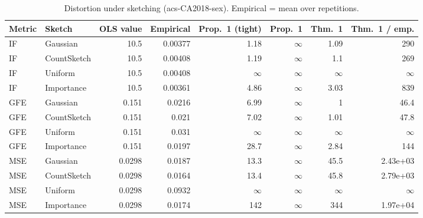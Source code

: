 \begin{table}[t]
\centering
\small
\begin{tabular}{llrrrrrr}
\toprule
Metric & Sketch & OLS value & Empirical & Prop.~1 (tight) & Prop.~1 & Thm.~1 & Thm.~1 / emp. \\
\midrule
IF & Gaussian & 10.5 & 0.00377 & 1.18 & $\infty$ & 1.09 & 290 \\
IF & CountSketch & 10.5 & 0.00408 & 1.19 & $\infty$ & 1.1 & 269 \\
IF & Uniform & 10.5 & 0.00408 & $\infty$ & $\infty$ & $\infty$ & $\infty$ \\
IF & Importance & 10.5 & 0.00361 & 4.86 & $\infty$ & 3.03 & 839 \\
\midrule
GFE & Gaussian & 0.151 & 0.0216 & 6.99 & $\infty$ & 1 & 46.4 \\
GFE & CountSketch & 0.151 & 0.021 & 7.02 & $\infty$ & 1.01 & 47.8 \\
GFE & Uniform & 0.151 & 0.031 & $\infty$ & $\infty$ & $\infty$ & $\infty$ \\
GFE & Importance & 0.151 & 0.0197 & 28.7 & $\infty$ & 2.84 & 144 \\
\midrule
MSE & Gaussian & 0.0298 & 0.0187 & 13.3 & $\infty$ & 45.5 & 2.43e+03 \\
MSE & CountSketch & 0.0298 & 0.0164 & 13.4 & $\infty$ & 45.8 & 2.79e+03 \\
MSE & Uniform & 0.0298 & 0.0932 & $\infty$ & $\infty$ & $\infty$ & $\infty$ \\
MSE & Importance & 0.0298 & 0.0174 & 142 & $\infty$ & 344 & 1.97e+04 \\
\bottomrule
\end{tabular}
\caption{Distortion under sketching (acs-CA2018-sex). Empirical = mean over repetitions.}
\label{tab:acs-CA2018-sex}
\end{table}